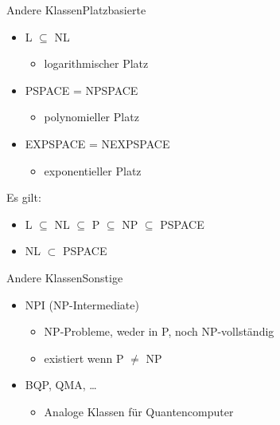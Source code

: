 \documentclass[ignorenonframetext,]{beamer}
\begin{document}
\begin{frame}{Andere Klassen}{Platzbasierte}

\begin{itemize}
\itemsep1pt\parskip0pt
\item
  L $\subseteq$ NL

  \begin{itemize}
  \itemsep1pt\parskip0pt
  \item
    logarithmischer Platz
  \end{itemize}
\item
  PSPACE = NPSPACE

  \begin{itemize}
  \itemsep1pt\parskip0pt
  \item
    polynomieller Platz
  \end{itemize}
\item
  EXPSPACE = NEXPSPACE

  \begin{itemize}
  \itemsep1pt\parskip0pt
  \item
    exponentieller Platz
  \end{itemize}
\end{itemize}

Es gilt:

\begin{itemize}
\itemsep1pt\parskip0pt
\item
  L $\subseteq$ NL $\subseteq$ P $\subseteq$ NP $\subseteq$ PSPACE
\item
  NL $\subset$ PSPACE
\end{itemize}

\end{frame}

\begin{frame}{Andere Klassen}{Sonstige}

\begin{itemize}
\itemsep1pt\parskip0pt
\item
  NPI (NP-Intermediate)

  \begin{itemize}
  \itemsep1pt\parskip0pt
  \item
    NP-Probleme, weder in P, noch NP-vollständig
  \item
    existiert wenn P $\neq$ NP
  \end{itemize}
\item
  BQP, QMA, \ldots{}

  \begin{itemize}
  \itemsep1pt\parskip0pt
  \item
    Analoge Klassen für Quantencomputer
  \end{itemize}
\end{itemize}

\end{frame}
\end{document}
